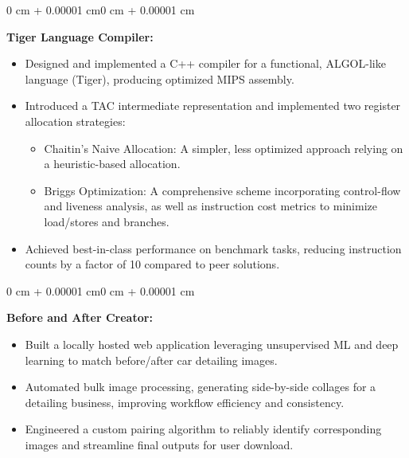 \documentclass[10pt, letterpaper]{article}
\newenvironment{highlights}{
    \begin{itemize}[
        topsep=0.10 cm,
        parsep=0.10 cm,
        partopsep=0pt,
        itemsep=0pt,
        leftmargin=0 cm + 10pt
    ]
}{
    \end{itemize}
}
\newenvironment{onecolentry}{
    \begin{adjustwidth}{0 cm + 0.00001 cm}{0 cm + 0.00001 cm}
}{
    \end{adjustwidth}
}
\begin{document}
\vspace{0.4 cm}

\begin{onecolentry}
    \textbf{Tiger Language Compiler:}
    \begin{highlights}
        \item Designed and implemented a C++ compiler for a functional, ALGOL-like language (Tiger), producing optimized MIPS assembly.
        \item Introduced a TAC intermediate representation and implemented two register allocation strategies:
            \begin{itemize}[leftmargin=15pt]
                \item Chaitin's Naive Allocation: A simpler, less optimized approach relying on a heuristic-based allocation.
                \item Briggs Optimization: A comprehensive scheme incorporating control-flow and liveness analysis, as well as instruction cost metrics to minimize load/stores and branches.
            \end{itemize}
        \item Achieved best-in-class performance on benchmark tasks, reducing instruction counts by a factor of 10 compared to peer solutions.
    \end{highlights}
\end{onecolentry}

\vspace{0.4 cm}

\begin{onecolentry}
    \textbf{Before and After Creator:}
    \begin{highlights}
        \item Built a locally hosted web application leveraging unsupervised ML and deep learning to match before/after car detailing images.
        \item Automated bulk image processing, generating side-by-side collages for a detailing business, improving workflow efficiency and consistency.
        \item Engineered a custom pairing algorithm to reliably identify corresponding images and streamline final outputs for user download.
    \end{highlights}
\end{onecolentry}
\end{document}
